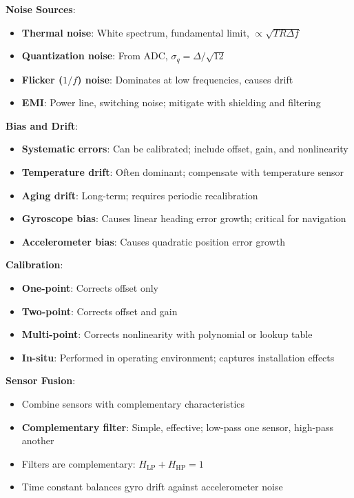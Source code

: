 \textbf{Noise Sources}:
\begin{itemize}
    \item \textbf{Thermal noise}: White spectrum, fundamental limit, $\propto \sqrt{T R \Delta f}$
    \item \textbf{Quantization noise}: From ADC, $\sigma_q = \Delta/\sqrt{12}$
    \item \textbf{Flicker ($1/f$) noise}: Dominates at low frequencies, causes drift
    \item \textbf{EMI}: Power line, switching noise; mitigate with shielding and filtering
\end{itemize}

\textbf{Bias and Drift}:
\begin{itemize}
    \item \textbf{Systematic errors}: Can be calibrated; include offset, gain, and nonlinearity
    \item \textbf{Temperature drift}: Often dominant; compensate with temperature sensor
    \item \textbf{Aging drift}: Long-term; requires periodic recalibration
    \item \textbf{Gyroscope bias}: Causes linear heading error growth; critical for navigation
    \item \textbf{Accelerometer bias}: Causes quadratic position error growth
\end{itemize}

\textbf{Calibration}:
\begin{itemize}
    \item \textbf{One-point}: Corrects offset only
    \item \textbf{Two-point}: Corrects offset and gain
    \item \textbf{Multi-point}: Corrects nonlinearity with polynomial or lookup table
    \item \textbf{In-situ}: Performed in operating environment; captures installation effects
\end{itemize}

\textbf{Sensor Fusion}:
\begin{itemize}
    \item Combine sensors with complementary characteristics
    \item \textbf{Complementary filter}: Simple, effective; low-pass one sensor, high-pass another
    \item Filters are complementary: $H_{\text{LP}} + H_{\text{HP}} = 1$
    \item Time constant balances gyro drift against accelerometer noise
\end{itemize}

